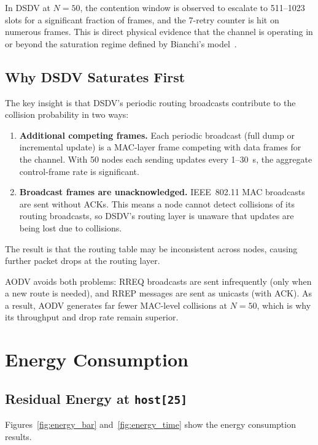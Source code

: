 In DSDV at $N = 50$, the contention window is observed to escalate to 511--1023 slots
for a significant fraction of frames, and the 7-retry counter is hit on numerous frames.
This is direct physical evidence that the channel is operating in or beyond the
saturation regime defined by Bianchi's model~\cite{bianchi2000}.

\subsection{Why DSDV Saturates First}

The key insight is that DSDV's periodic routing broadcasts contribute to the collision
probability in two ways:

\begin{enumerate}
  \item \textbf{Additional competing frames.} Each periodic broadcast (full dump or
    incremental update) is a MAC-layer frame competing with data frames for the channel.
    With 50 nodes each sending updates every 1--30~s, the aggregate control-frame rate
    is significant.
  \item \textbf{Broadcast frames are unacknowledged.} IEEE~802.11 MAC broadcasts are
    sent without ACKs. This means a node cannot detect collisions of its routing
    broadcasts, so DSDV's routing layer is unaware that updates are being lost due to
    collisions.
\end{enumerate}

The result is that the routing table may be inconsistent across nodes, causing further
packet drops at the routing layer.

AODV avoids both problems: RREQ broadcasts are sent infrequently (only when a new route
is needed), and RREP messages are sent as unicasts (with ACK). As a result, AODV
generates far fewer MAC-level collisions at $N = 50$, which is why its throughput and
drop rate remain superior.

\section{Energy Consumption}

\subsection{Residual Energy at \texttt{host[25]}}

Figures~\ref{fig:energy_bar} and~\ref{fig:energy_time} show the energy consumption
results.

